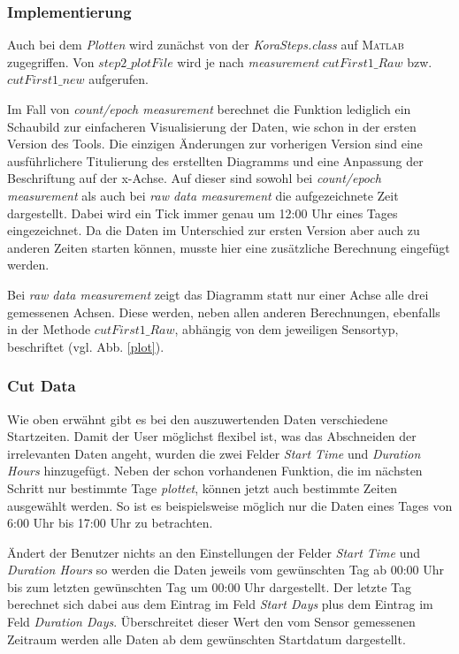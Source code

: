\documentclass[onecolumn,german]{article}
\begin{document}
\subsubsection{Implementierung}
\label{plot_impl}
Auch bei dem \textit{Plotten} wird zunächst von der \textit{KoraSteps.class} auf \textsc{Matlab} zugegriffen. Von \textit{$step2\_plotFile$} wird je nach \textit{measurement} \textit{$cutFirst1\_Raw$} bzw. \textit{$cutFirst1\_new$} aufgerufen.\newline 

Im Fall von \textit{count/epoch measurement} berechnet die Funktion lediglich ein Schaubild zur einfacheren Visualisierung der Daten, wie schon in der ersten Version des Tools. Die einzigen Änderungen zur vorherigen Version sind eine ausführlichere Titulierung des erstellten Diagramms und eine Anpassung der Beschriftung auf der x-Achse. Auf dieser sind sowohl bei \textit{count/epoch measurement} als auch bei \textit{raw data measurement} die aufgezeichnete Zeit dargestellt. Dabei wird ein Tick immer genau um 12:00 Uhr eines Tages eingezeichnet. Da die Daten im Unterschied zur ersten Version aber auch zu anderen Zeiten starten können, musste hier eine zusätzliche Berechnung eingefügt werden.\newline

Bei \textit{raw data measurement} zeigt das Diagramm statt nur einer Achse alle drei gemessenen Achsen. Diese werden, neben allen anderen Berechnungen, ebenfalls in der Methode \textit{$cutFirst1\_Raw$}, abhängig von dem jeweiligen Sensortyp, beschriftet (vgl. Abb. \ref{plot}).


\subsubsection{Cut Data}
Wie oben erwähnt gibt es bei den auszuwertenden Daten verschiedene Startzeiten. Damit der User möglichst flexibel ist, was das Abschneiden der irrelevanten Daten angeht, wurden die zwei Felder \textit{Start Time} und \textit{Duration Hours} hinzugefügt. Neben der schon vorhandenen Funktion, die im nächsten Schritt nur bestimmte Tage \textit{plottet}, können jetzt auch bestimmte Zeiten ausgewählt werden. So ist es beispielsweise möglich nur die Daten eines Tages von 6:00 Uhr bis 17:00 Uhr zu betrachten.\newline 

Ändert der Benutzer nichts an den Einstellungen der Felder \textit{Start Time} und \textit{Duration Hours} so werden die Daten jeweils vom gewünschten Tag ab 00:00 Uhr bis zum letzten gewünschten Tag um 00:00 Uhr dargestellt. Der letzte Tag berechnet sich dabei aus dem Eintrag im Feld \textit{Start Days} plus dem Eintrag im Feld \textit{Duration Days}. Überschreitet dieser Wert den vom Sensor gemessenen Zeitraum werden alle Daten ab dem gewünschten Startdatum dargestellt.\newline
\end{document}

